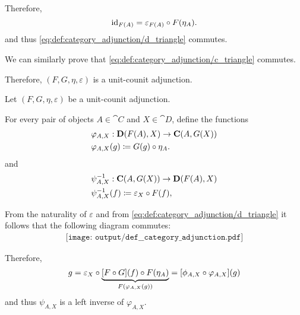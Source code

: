 \begin{defproof}
  Therefore,
  \begin{equation*}
    \id_{F(A)} = \varepsilon_{F(A)} \bincirc F(\eta_A).
  \end{equation*}
  and thus \eqref{eq:def:category_adjunction/d_triangle} commutes.

  We can similarly prove that \eqref{eq:def:category_adjunction/c_triangle} commutes.

  Therefore, \( (F, G, \eta, \varepsilon) \) is a unit-counit adjunction.

   Let \( (F, G, \eta, \varepsilon) \) be a unit-counit adjunction.

  For every pair of objects \( A \in \cat{C} \) and \( X \in \cat{D} \), define the functions
  \begin{equation*}
    \begin{aligned}
      &\varphi_{A,X}: \cat{D}(F(A), X) \to \cat{C}(A, G(X)) \\
      &\varphi_{A,X}(g) \coloneqq G(g) \bincirc \eta_A.
    \end{aligned}
  \end{equation*}
  and
  \begin{equation*}
    \begin{aligned}
      &\psi_{A,X}^{-1}: \cat{C}(A, G(X)) \to \cat{D}(F(A), X) \\
      &\psi_{A,X}^{-1}(f) \coloneqq \varepsilon_X \bincirc F(f),
    \end{aligned}
  \end{equation*}

  From the naturality of \( \varepsilon \) and from \eqref{eq:def:category_adjunction/d_triangle} it follows that the following diagram commutes:
  \begin{equation}\label{eq:def:category_adjunction/varphi_inverse_def}
    \begin{aligned}
      \texttt{[image: output/def\_\_category\_adjunction.pdf]}
    \end{aligned}
  \end{equation}

  Therefore,
  \begin{equation*}
    g = \varepsilon_X \bincirc \underbrace{[F \bincirc G](f) \bincirc F(\eta_A)}_{F(\varphi_{A,X}(g))} = [\phi_{A,X} \bincirc \varphi_{A,X}](g)
  \end{equation*}
  and thus \( \psi_{A,X} \) is a left inverse of \( \varphi_{A,X} \).


\end{defproof}
